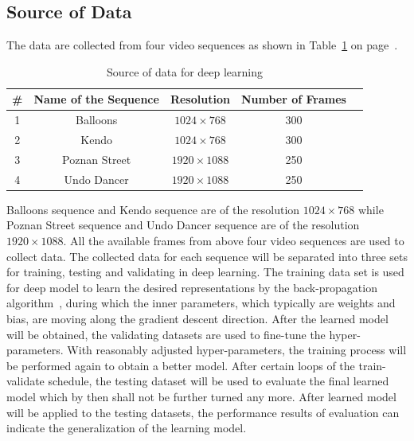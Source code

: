 \subsection{Source of Data}\label{subsec:source-of-data}
The data are collected from four video sequences as shown in
Table~\ref{tab:data-source}
on page~\pageref{tab:data-source}.
\begin{table}[!htbp]
    \caption{Source of data for deep learning}
    \bigskip\label{tab:data-source}
    \centering
    \begin{tabular}{c c c c c}
        \toprule
        \# & Name of the Sequence & Resolution & Number of Frames\\
        \midrule
        1 & Balloons & \(1024\times768\) & 300\\
        2 & Kendo & \(1024\times768\) & 300\\
        3 & Poznan Street & \(1920\times1088\) & 250\\
        4 & Undo Dancer & \(1920\times1088\) & 250\\
        \bottomrule
    \end{tabular}
\end{table}
Balloons sequence and Kendo sequence are of the resolution \(1024\times768\)
while Poznan Street sequence and Undo Dancer sequence are 
of the resolution \(1920\times1088\).
All the available frames from above four video sequences 
are used to collect data.
The collected data for each sequence will be separated into three sets
for training, testing and validating in deep learning.
The training data set is used for deep model to learn the desired
representations by the back-propagation algorithm~\parencite{RN204},
during which the inner parameters, which typically are 
weights and bias, are moving
along the gradient descent direction.
After the learned model will be obtained, the validating datasets are used to
fine-tune the hyper-parameters.
With reasonably adjusted hyper-parameters, the training process will be
performed again to obtain a better model.
After certain loops of the train-validate schedule, the testing dataset will
be used to evaluate the final learned model which by then
shall not be further turned any more.
After learned model will be applied to the testing datasets, the performance
results of evaluation can indicate the generalization of the learning model.


